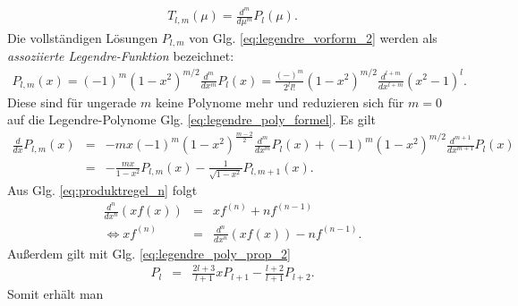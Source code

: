\documentclass{book}
\begin{document}
\begin{eqnarray}
T_{l, m}\left(\mu\right) = \frac{d^m}{d\mu^m}P_l\left(\mu\right).
\end{eqnarray}
%
Die vollständigen Lösungen $P_{l, m}$ von Glg. \eqref{eq:legendre_vorform_2} werden als \textit{assoziierte Legendre-Funktion} bezeichnet:
%
\begin{eqnarray}
P_{l, m}\left(x\right) = \left(-1\right)^m\left(1 - x^2\right)^{m/2}\frac{d^{m}}{dx^{m}}P_l\left(x\right) = \frac{\left(-\right)^m}{2^ll!}\left(1 - x^2\right)^{m/2}\frac{d^{l + m}}{dx^{l + m}}\left(x^2 - 1\right)^l.\label{eq:assoziierte_legendre_funktionen}
\end{eqnarray}
%
Diese sind für ungerade $m$ keine Polynome mehr und reduzieren sich für $m = 0$ auf die Legendre-Polynome Glg. \eqref{eq:legendre_poly_formel}. Es gilt
%
\begin{eqnarray}
\frac{d}{dx}P_{l, m}\left(x\right) & = & -mx\left(-1\right)^m\left(1 - x^2\right)^\frac{m - 2}{2}\frac{d^{m}}{dx^{m}}P_l\left(x\right) + \left(-1\right)^m\left(1 - x^2\right)^{m/2}\frac{d^{m + 1}}{dx^{m + 1}}P_l\left(x\right)\nonumber\\
& = & -\frac{mx}{1 - x^2}P_{l, m}\left(x\right) - \frac{1}{\sqrt{1 - x^2}}P_{l, m + 1}\left(x\right).\label{eq:legendre_ass_prop_2}
\end{eqnarray}
%
Aus Glg. \eqref{eq:produktregel_n} folgt
%
\begin{eqnarray}
\frac{d^n}{dx^n}\left(xf\left(x\right)\right) & = & xf^{(n)} + nf^{(n - 1)}\nonumber\\
\Leftrightarrow xf^{(n)} & = & \frac{d^n}{dx^n}\left(xf\left(x\right)\right) - nf^{(n - 1)}.
\end{eqnarray}
%
Außerdem gilt mit Glg. \eqref{eq:legendre_poly_prop_2}
%
\begin{eqnarray}
P_l & = & \frac{2l + 3}{l + 1}xP_{l + 1} - \frac{l + 2}{l + 1}P_{l + 2}.
\end{eqnarray}
%
Somit erhält man
%
\end{document}
